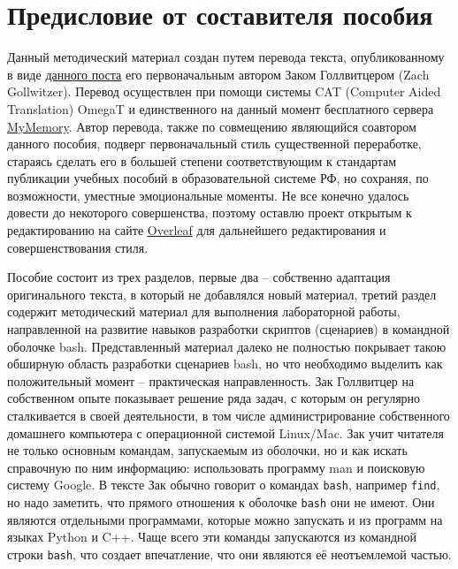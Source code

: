 \documentclass[a4paper,12pt,final,openany]{extbook}
\begin{document}
\mainmatter
\setcounter{tocdepth}{1}
\renewcommand{\contentsname}{Содержание}
\tableofcontents

\clearpage

\chapter*{Предисловие от составителя пособия}

Данный методический материал создан путем перевода текста, опубликованному в виде \href{https://zach-gollwitzer.medium.com/the-ultimate-bash-crash-course-cb598141ad03}{данного поста} его первоначальным автором Заком Голлвитцером (Zach Gollwitzer). Перевод осуществлен при помощи системы CAT (Computer Aided Translation) OmegaT и единственного на данный момент бесплатного сервера \href{https://mymemory.translated.net/}{MyMemory}. Автор перевода, также по совмещению являющийся соавтором данного пособия, подверг первоначальный стиль существенной переработке, стараясь сделать его в большей степени соответствующим к стандартам публикации учебных пособий в образовательной системе РФ, но сохраняя, по возможности, уместные эмоциональные моменты. Не все конечно удалось довести до некоторого совершенства, поэтому оставлю проект открытым к редактированию на сайте \href{https://www.overleaf.com/project/602cc04c00be7fbbe118f862}{Overleaf} для дальнейшего редактирования и совершенствования стиля.

Пособие состоит из трех разделов, первые два -- собственно адаптация оригинального текста, в который не добавлялся новый материал, третий раздел содержит методический материал для выполнения лабораторной работы, направленной на развитие навыков разработки скриптов (сценариев) в командной оболочке bash. Представленный материал далеко не полностью покрывает такою обширную область разработки сценариев bash, но что необходимо выделить как положительный момент -- практическая направленность. Зак Голлвитцер на собственном опыте показывает решение ряда задач, с которым он регулярно сталкивается в своей деятельности, в том числе администрирование собственного домашнего компьютера с операционной системой Linux/Mac. Зак учит читателя не только основным командам, запускаемым из оболочки, но и как искать справочную по ним информацию: использовать программу man и поисковую систему Google. В тексте Зак обычно говорит о командах \texttt{bash}, например \texttt{find}, но надо заметить, что прямого отношения к оболочке \texttt{bash} они не имеют. Они являются отдельными программами, которые можно запускать и из программ на языках Python и C++.  Чаще всего эти команды запускаются из командной строки \texttt{bash}, что создает впечатление, что они являются её неотъемлемой частью.
\end{document}

